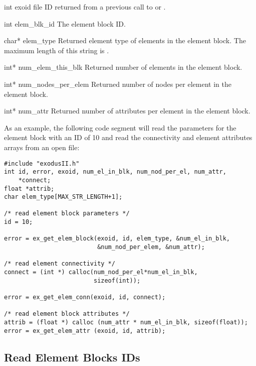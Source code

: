 
\begin{parameters}
\item[{int exoid \R{}}]
\exo{} file ID returned from a previous call to  or
.

\item[{int elem_blk_id \R{}}]
The element block ID.

\item[{char* elem_type \W{}}]
Returned element type of elements in the element block.
The maximum length of this string is .

\item[{int* num_elem_this_blk \W{}}]
Returned number of elements in the element block.

\item[{int* num_nodes_per_elem \W{}}]
Returned number of nodes per element in the element block.

\item[{int* num_attr \W{}}]
Returned number of attributes per element in the element block.
\end{parameters}


As an example, the following code segment will read the parameters for
the element block with an ID of 10 and read the connectivity and
element attributes arrays from an open \exo{} file:
\begin{lstlisting}
#include "exodusII.h"
int id, error, exoid, num_el_in_blk, num_nod_per_el, num_attr,
    *connect;
float *attrib;
char elem_type[MAX_STR_LENGTH+1];

/* read element block parameters */
id = 10;

error = ex_get_elem_block(exoid, id, elem_type, &num_el_in_blk,
                          &num_nod_per_elem, &num_attr);

/* read element connectivity */
connect = (int *) calloc(num_nod_per_el*num_el_in_blk,
                         sizeof(int));

error = ex_get_elem_conn(exoid, id, connect);

/* read element block attributes */
attrib = (float *) calloc (num_attr * num_el_in_blk, sizeof(float));
error = ex_get_elem_attr (exoid, id, attrib);
\end{lstlisting}

\subsection{Read Element Blocks IDs}

